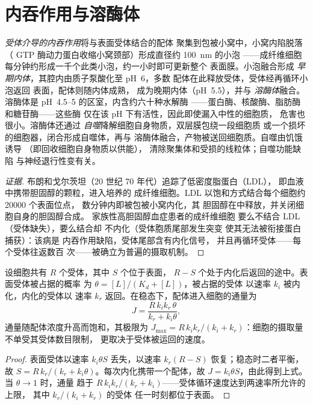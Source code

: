 \section{内吞作用与溶酶体}

\begin{definition}[内吞作用]\label{def:b3:membrane-traffic:endocytosis}
\emph{受体介导的内吞作用}将与表面受体结合的配体
聚集到包被小窝中，小窝内陷脱落（
GTP 酶动力蛋白收缩小窝颈部）形成直径约 \qty{100}{nm} 的小泡
——成纤维细胞每分钟约形成一千个此类小泡，约一小时即可更新整个
表面膜。小泡融合形成
\emph{早期内体}，其腔内由质子泵酸化至 pH~6，多数
配体在此释放受体，受体经再循环小泡返回
表面，配体则随内体成熟，
成为晚期内体（pH~5.5），并与
\emph{溶酶体}融合。溶酶体是 pH~4.5--5 的区室，内含约六十种水解酶
——蛋白酶、核酸酶、脂肪酶和糖苷酶——这些酶
仅在该 pH 下有活性，因此即使漏入中性的细胞质，
危害也很小。溶酶体还通过
\emph{自噬}降解细胞自身物质，双层膜包绕一段细胞质
或一个损坏的细胞器，闭合形成自噬体，再与
溶酶体融合，产物被送回细胞质。自噬由饥饿诱导
（即回收细胞自身物质以供能），
清除聚集体和受损的线粒体；自噬功能缺陷
与神经退行性变有关。
\end{definition}

\begin{proof}[证据]
布朗和戈尔茨坦（20 世纪 70 年代）追踪了低密度脂蛋白（LDL），
即血液中携带胆固醇的颗粒，进入培养的
成纤维细胞。LDL 以饱和方式结合每个细胞约 \num{20000} 个表面位点，
数分钟内即被包被小窝内化，其
胆固醇在中释放，并关闭细胞自身的胆固醇合成。
家族性高胆固醇血症患者的成纤维细胞
要么不结合 LDL（受体缺失），要么结合却
不内化（受体胞质尾部发生突变
使其无法被衔接蛋白捕获）：该病是
内吞作用缺陷，受体尾部含有内化信号，
并且再循环受体——每个受体往返数百
次——被确立为普遍的摄取机制。
\end{proof}

\begin{proposition}[经再循环受体的摄取]\label{prop:b3:membrane-traffic:uptake}
设细胞共有 $R$ 个受体，其中 $S$ 个位于表面，
$R - S$ 个处于内化后返回的途中。表面受体被占据的概率
为 $\theta = [L]/(K_{d} + [L])$，被占据的受体
以速率 $k_{i}$ 被内化，内化的受体以
速率 $k_{r}$ 返回。在稳态下，配体进入细胞的通量为
\[
J = \frac{R\,k_{i}k_{r}\,\theta}{k_{r} + k_{i}\theta},
\]
通量随配体浓度升高而饱和，其极限为 $J_{\max} =
R\,k_{i}k_{r}/(k_{i} + k_{r})$：细胞的摄取量不单受其受体数目限制，
更取决于受体被运回的速度。
\end{proposition}
\begin{proof}
表面受体以速率 $k_{i}\theta S$ 丢失，以速率
$k_{r}(R - S)$ 恢复；稳态时二者平衡，故 $S = R\,k_{r}/(k_{r}
+ k_{i}\theta)$。每次内化携带一个配体，故 $J =
k_{i}\theta S$，由此得到上式。当 $\theta \to 1$ 时，通量
趋于 $R\,k_{i}k_{r}/(k_{r} + k_{i})$——受体循环速度达到两速率所允许的上限，
其中 $k_{r}/(k_{i} + k_{r})$ 的受体
任一时刻都位于表面。
\end{proof}

